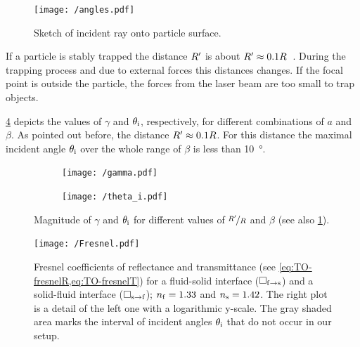 \begin{figure}[thp]
  \centering
  \texttt{[image: /angles.pdf]}
  \caption{Sketch of incident ray onto particle surface.}
  \label{fig:TO-angles}
\end{figure}

If a particle is stably trapped the distance $R^{\prime}$ is about $R^{\prime} 
\approx 0.1R$~\cite{Lamprecht2017}. During the trapping process and due to 
external forces this distances changes. If the focal point is outside the 
particle, the forces from the laser beam are too small to trap objects.

\cref{fig:TO-gamma_theta} depicts the values of $\gamma$ and $\theta_{\mathrm{i}}$, 
respectively, for different combinations of $a$ and $\beta$. As pointed out 
before, the distance $R^{\prime} \approx 0.1R$. For this distance the maximal 
incident angle $\theta_{\mathrm{i}}$ over the whole range of $\beta$ is less than 
\SI{10}{\degree}.

\begin{figure}
  \centering
  \begin{subfigure}[b]{0.45\textwidth}
    \centering
    \texttt{[image: /gamma.pdf]}
    \caption{}
    \label{fig:TO-gamma}
  \end{subfigure}
  \hfill
  \begin{subfigure}[b]{0.45\textwidth}
    \centering
    \texttt{[image: /theta\_i.pdf]}
    \caption{}
    \label{fig:TO-theta_i}
  \end{subfigure}
    \caption{Magnitude of $\gamma$ and $\theta_{\mathrm{i}}$ for different values of 
    $\nicefrac{R^{\prime}}{R}$ and $\beta$ (see also \cref{fig:TO-angles}).}
  \label{fig:TO-gamma_theta}
\end{figure}

\begin{figure}[tbp]
  \centering
  \texttt{[image: /Fresnel.pdf]}
  \caption{Fresnel coefficients of reflectance and transmittance (see 
    \cref{eq:TO-fresnelR,eq:TO-fresnelT}) for a fluid-solid interface 
    ($\Box_{\mathrm{f}\rightarrow\mathrm{s}}$) and a solid-fluid interface 
    ($\Box_{\mathrm{s}\rightarrow\mathrm{f}}$); $n_{\mathrm{f}}=1.33$ and $n_{\mathrm{s}}=1.42$. The right 
    plot is a detail of the left one with a logarithmic y-scale. The gray 
    shaded area marks the interval of incident angles $\theta_{\mathrm{i}}$ that do not 
  occur in our setup.}
  \label{fig:TO-fresnel}
\end{figure}


